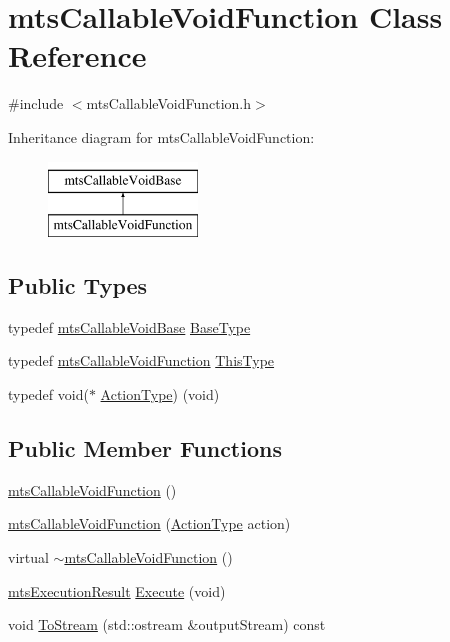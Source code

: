 \hypertarget{classmts_callable_void_function}{}\section{mts\+Callable\+Void\+Function Class Reference}
\label{classmts_callable_void_function}


{\ttfamily \#include $<$mts\+Callable\+Void\+Function.\+h$>$}

Inheritance diagram for mts\+Callable\+Void\+Function\+:\begin{figure}[H]
\begin{center}
\leavevmode
\includegraphics[height=2.000000cm]{d2/d03/classmts_callable_void_function}
\end{center}
\end{figure}
\subsection*{Public Types}
\begin{DoxyCompactItemize}
\item 
typedef \hyperlink{classmts_callable_void_base}{mts\+Callable\+Void\+Base} \hyperlink{classmts_callable_void_function_a9a675710ec6f9f9e3bd9ed8b22755585}{Base\+Type}
\item 
typedef \hyperlink{classmts_callable_void_function}{mts\+Callable\+Void\+Function} \hyperlink{classmts_callable_void_function_a4885dc4c6ac40e229baca8146d328ae1}{This\+Type}
\item 
typedef void($\ast$ \hyperlink{classmts_callable_void_function_a2df84595ba2652ef1d50d1297b023fd5}{Action\+Type}) (void)
\end{DoxyCompactItemize}
\subsection*{Public Member Functions}
\begin{DoxyCompactItemize}
\item 
\hyperlink{classmts_callable_void_function_a81ec2fae6358fd930b74b1c697e33c4a}{mts\+Callable\+Void\+Function} ()
\item 
\hyperlink{classmts_callable_void_function_a31135fe8eaad23b834794201ca081d6a}{mts\+Callable\+Void\+Function} (\hyperlink{classmts_callable_void_function_a2df84595ba2652ef1d50d1297b023fd5}{Action\+Type} action)
\item 
virtual \hyperlink{classmts_callable_void_function_a6156a087323cf3dd618faf2a02abdcfd}{$\sim$mts\+Callable\+Void\+Function} ()
\item 
\hyperlink{classmts_execution_result}{mts\+Execution\+Result} \hyperlink{classmts_callable_void_function_a45faf2d05a2e89e5fc5e9cb0ec39fc98}{Execute} (void)
\item 
void \hyperlink{classmts_callable_void_function_adc5449fa0167851e7f2edd3c66943fa6}{To\+Stream} (std\+::ostream \&output\+Stream) const 
\end{DoxyCompactItemize}
